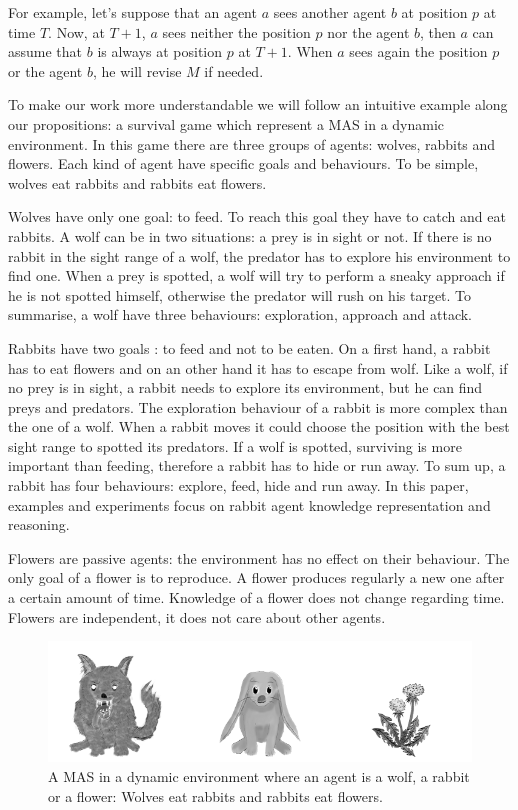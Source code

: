 \documentclass{aamas2012}
\begin{document}
	For example, let's suppose that an agent $a$ sees another agent $b$ at position $p$ at time $T$.
	Now, at $T+1$, $a$ sees neither the position $p$ nor the agent $b$, then $a$ can assume that $b$ is always at position $p$ at $T+1$.
	When $a$ sees again the position $p$ or the agent $b$, he will revise $M$ if needed.
	
	To make our work more understandable we will follow an intuitive example along our propositions: a survival game which represent a MAS in a dynamic environment.
	In this game there are three groups of agents: wolves, rabbits and flowers.
	Each kind of agent have specific goals and behaviours.
	To be simple, wolves eat rabbits and rabbits eat flowers.
	
	Wolves have only one goal: to feed.
	To reach this goal they have to catch and eat rabbits.
	A wolf can be in two situations: a prey is in sight or not.
	If there is no rabbit in the sight range of a wolf, the predator has to explore his environment to find one.
	When a prey is spotted, a wolf will try to perform a sneaky approach if he is not spotted himself, otherwise the predator will rush on his target.
	To summarise, a wolf have three behaviours: exploration, approach and attack.
	
	Rabbits have two goals : to feed and not to be eaten.
	On a first hand, a rabbit has to eat flowers and on an other hand it has to escape from wolf.
	Like a wolf, if no prey is in sight, a rabbit needs to explore its environment, but he can find preys and predators.
	The exploration behaviour of a rabbit is more complex than the one of a wolf.
	When a rabbit moves it could choose the position with the best sight range to spotted its predators.
	If a wolf is spotted, surviving is more important than feeding, therefore a rabbit has to hide or run away.
	To sum up, a rabbit has four behaviours: explore, feed, hide and run away.
	In this paper, examples and experiments focus on rabbit agent knowledge representation and reasoning.
	
	Flowers are passive agents: the environment has no effect on their behaviour.
	The only goal of a flower is to reproduce.
	A flower produces regularly a new one after a certain amount of time.
	Knowledge of a flower does not change regarding time.
	Flowers are independent, it does not care about other agents.

	\begin{figure}
		\centering
		\includegraphics[keepaspectratio=true,scale=3.0]{food_chain.png}
		\caption
		{
			\label{food_chain}
			A MAS in a dynamic environment where an agent is a wolf, a rabbit or a flower:
			Wolves eat rabbits and rabbits eat flowers.
		}
	\end{figure}
	
\end{document}
